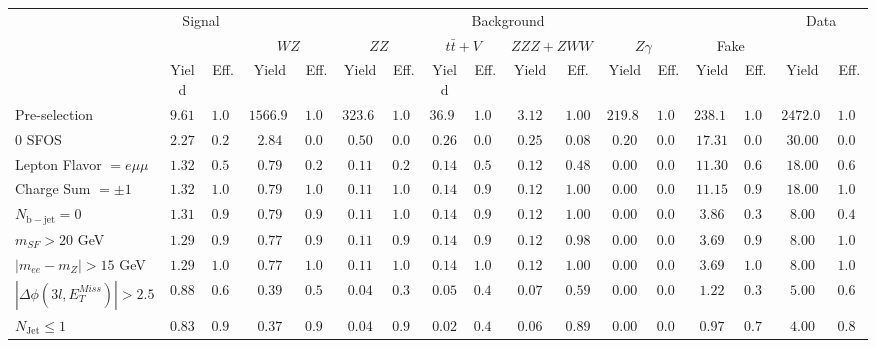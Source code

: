 \begin{tabular}{l||c|c||c|c||c|c||c|c||c|c||c|c||c|c||c|c}
\hline
 &                 \multicolumn{2}{c||}{Signal}            &  \multicolumn{12}{c||}{Background} &  \multicolumn{2}{c}{Data} \\
 & &  & \multicolumn{2}{c||}{$WZ$} & \multicolumn{2}{c||}{$ZZ$} & \multicolumn{2}{c||}{$t\bar{t}+V$} & \multicolumn{2}{c||}{$ZZZ+ZWW$} & \multicolumn{2}{c||}{$Z\gamma$} & \multicolumn{2}{c||}{Fake} &  & \\ 
 & Yield & Eff. & Yield & Eff. & Yield & Eff. & Yield & Eff. & Yield & Eff. & Yield & Eff. & Yield & Eff. & Yield & Eff.\\
\hline\hline
Pre-selection &  $9.61$ &  $1.00$ &  $1566.90$ &  $1.00$ &  $323.60$ &  $1.00$ &  $36.93$ &  $1.00$ &  $3.12$ &  $1.00$ &  $219.80$ &  $1.00$ &  $238.12$ &  $1.00$ &  $2472.00$ &  $1.00$\\ 
\hline
0 SFOS &  $2.27$ &  $0.24$ &  $2.84$ &  $0.00$ &  $0.50$ &  $0.00$ &  $0.26$ &  $0.01$ &  $0.25$ &  $0.08$ &  $0.20$ &  $0.00$ &  $17.31$ &  $0.07$ &  $30.00$ &  $0.01$\\ 
\hline
Lepton Flavor $= e\mu\mu$ &  $1.32$ &  $0.58$ &  $0.79$ &  $0.28$ &  $0.11$ &  $0.22$ &  $0.14$ &  $0.54$ &  $0.12$ &  $0.48$ &  $0.00$ &  $0.00$ &  $11.30$ &  $0.65$ &  $18.00$ &  $0.60$\\ 
\hline
Charge Sum $= \pm 1$ &  $1.32$ &  $1.00$ &  $0.79$ &  $1.00$ &  $0.11$ &  $1.00$ &  $0.14$ &  $0.99$ &  $0.12$ &  $1.00$ &  $0.00$ &  $0.00$ &  $11.15$ &  $0.99$ &  $18.00$ &  $1.00$\\ 
\hline
$N_{\mathrm{b-jet}} = 0$ &  $1.31$ &  $0.99$ &  $0.79$ &  $0.99$ &  $0.11$ &  $1.00$ &  $0.14$ &  $0.98$ &  $0.12$ &  $1.00$ &  $0.00$ &  $0.00$ &  $3.86$ &  $0.35$ &  $8.00$ &  $0.44$\\ 
\hline
$m_{SF} > 20$ GeV &  $1.29$ &  $0.98$ &  $0.77$ &  $0.98$ &  $0.11$ &  $0.97$ &  $0.14$ &  $0.98$ &  $0.12$ &  $0.98$ &  $0.00$ &  $0.00$ &  $3.69$ &  $0.96$ &  $8.00$ &  $1.00$\\ 
\hline
$|m_{ee} - m_{Z}| > 15$ GeV &  $1.29$ &  $1.00$ &  $0.77$ &  $1.00$ &  $0.11$ &  $1.00$ &  $0.14$ &  $1.00$ &  $0.12$ &  $1.00$ &  $0.00$ &  $0.00$ &  $3.69$ &  $1.00$ &  $8.00$ &  $1.00$\\ 
\hline
$|\Delta\phi(3l,E_{T}^{Miss})| > 2.5$ &  $0.88$ &  $0.68$ &  $0.39$ &  $0.51$ &  $0.04$ &  $0.39$ &  $0.05$ &  $0.40$ &  $0.07$ &  $0.59$ &  $0.00$ &  $0.00$ &  $1.22$ &  $0.33$ &  $5.00$ &  $0.62$\\ 
\hline
$N_{\mathrm{Jet}} \leq 1$ &  $0.83$ &  $0.95$ &  $0.37$ &  $0.95$ &  $0.04$ &  $0.94$ &  $0.02$ &  $0.45$ &  $0.06$ &  $0.89$ &  $0.00$ &  $0.00$ &  $0.97$ &  $0.79$ &  $4.00$ &  $0.80$\\ 
\hline
\end{tabular}
